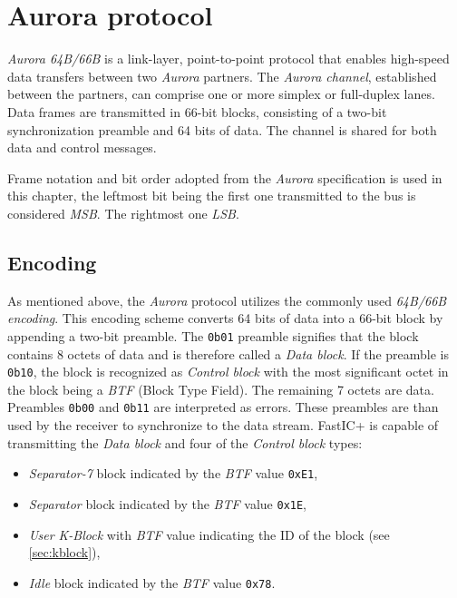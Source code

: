 
\chapter{Aurora protocol}
\emph{Aurora 64B/66B} is a link-layer, point-to-point protocol that enables high-speed data transfers between two \emph{Aurora} partners. The \emph{Aurora channel}, established between the partners, can comprise one or more simplex or full-duplex lanes. Data frames are transmitted in 66-bit blocks, consisting of a two-bit synchronization preamble and 64 bits of data. The channel is shared for both data and control messages. \cite{auroraSpec}

Frame notation and bit order adopted from the \emph{Aurora} specification \cite{auroraSpec} is used in this chapter, the leftmost bit being the first one transmitted to the bus is considered \emph{MSB}. The rightmost one \emph{LSB}.
%
\section{Encoding}
As mentioned above, the \emph{Aurora} protocol utilizes the commonly used \emph{64B/66B encoding}. This encoding scheme converts 64 bits of data into a 66-bit block by appending a two-bit preamble. The \verb|0b01| preamble signifies that the block contains 8 octets of data and is therefore called a \emph{Data block}. If the preamble is \verb|0b10|, the block is recognized as \emph{Control block} with the most significant octet in the block being a \emph{BTF} (Block Type Field). The remaining 7 octets are data. Preambles \verb|0b00| and \verb|0b11| are interpreted as errors. These preambles are than used by the receiver to synchronize to the data stream. \cite{auroraSpec}
\newline\newline
FastIC+ is capable of transmitting the \emph{Data block} and four of the \emph{Control block} types: \cite{ficDatasheet}
\begin{itemize}
    \item \emph{Separator-7} block indicated by the \emph{BTF} value \verb|0xE1|,
    \item \emph{Separator} block indicated by the \emph{BTF} value \verb|0x1E|,
    \item \emph{User K-Block} with \emph{BTF} value indicating the ID of the block (see \ref{sec:kblock}),
    \item \emph{Idle} block indicated by the \emph{BTF} value \verb|0x78|.
\end{itemize}

